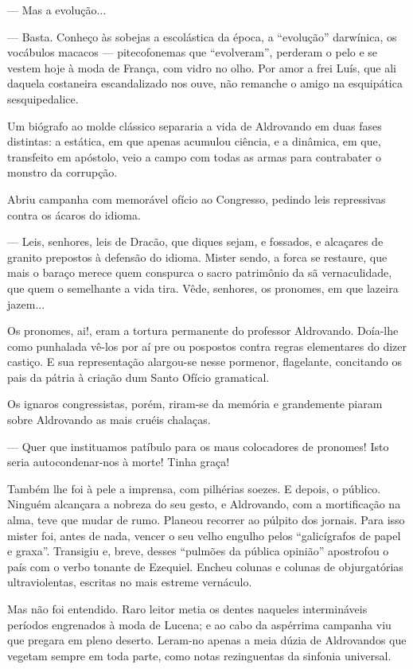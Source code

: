 --- Mas a evolução...

--- Basta. Conheço às sobejas a escolástica da época, a ``evolução''
darwínica, os vocábulos macacos --- pitecofonemas que ``evolveram'',
perderam o pelo e se vestem hoje à moda de França, com vidro no olho.
Por amor a frei Luís, que ali daquela costaneira escandalizado nos ouve,
não remanche o amigo na esquipática sesquipedalice.

Um biógrafo ao molde clássico separaria a vida de Aldrovando em duas
fases distintas: a estática, em que apenas acumulou ciência, e a
dinâmica, em que, transfeito em apóstolo, veio a campo com todas as
armas para contrabater o monstro da corrupção.

Abriu campanha com memorável ofício ao Congresso, pedindo leis
repressivas contra os ácaros do idioma.

--- Leis, senhores, leis de Dracão, que diques sejam, e fossados, e
alcaçares de granito prepostos à defensão do idioma. Mister sendo, a
forca se restaure, que mais o baraço merece quem conspurca o sacro
patrimônio da sã vernaculidade, que quem o semelhante a vida tira. Vêde,
senhores, os pronomes, em que lazeira jazem...

Os pronomes, ai!, eram a tortura permanente do professor Aldrovando.
Doía-lhe como punhalada vê-los por aí pre ou pospostos contra regras
elementares do dizer castiço. E sua representação alargou-se nesse
pormenor, flagelante, concitando os pais da pátria à criação dum Santo
Ofício gramatical.

Os ignaros congressistas, porém, riram-se da memória e grandemente
piaram sobre Aldrovando as mais cruéis chalaças.

--- Quer que instituamos patíbulo para os maus colocadores de pronomes!
Isto seria autocondenar-nos à morte! Tinha graça!

Também lhe foi à pele a imprensa, com pilhérias soezes. E depois, o
público. Ninguém alcançara a nobreza do seu gesto, e Aldrovando, com a
mortificação na alma, teve que mudar de rumo. Planeou recorrer ao
púlpito dos jornais. Para isso mister foi, antes de nada, vencer o seu
velho engulho pelos ``galicígrafos de papel e graxa''. Transigiu e,
breve, desses ``pulmões da pública opinião'' apostrofou o país com o
verbo tonante de Ezequiel. Encheu colunas e colunas de objurgatórias
ultraviolentas, escritas no mais estreme vernáculo.

Mas não foi entendido. Raro leitor metia os dentes naqueles
intermináveis períodos engrenados à moda de Lucena; e ao cabo da
aspérrima campanha viu que pregara em pleno deserto. Leram-no apenas a
meia dúzia de Aldrovandos que vegetam sempre em toda parte, como notas
rezinguentas da sinfonia universal.

